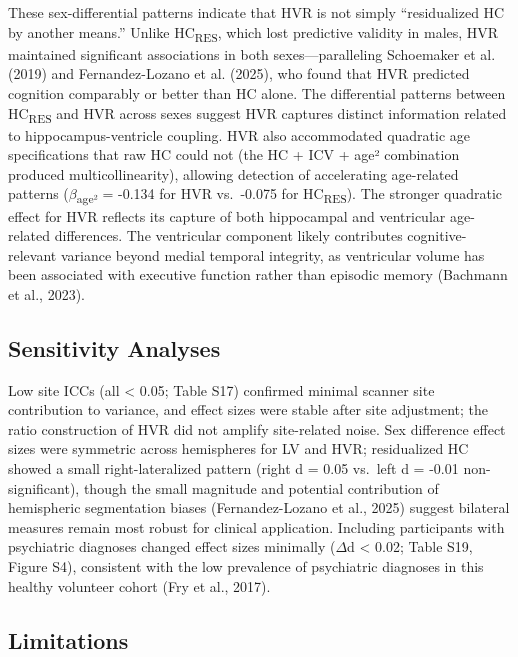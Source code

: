 \documentclass[
]{article}
\begin{document}
These sex-differential patterns indicate that HVR is not simply
``residualized HC by another means.'' Unlike HC\textsubscript{RES},
which lost predictive validity in males, HVR maintained significant
associations in both sexes---paralleling Schoemaker et al. (2019) and
Fernandez-Lozano et al. (2025), who found that HVR predicted cognition
comparably or better than HC alone. The differential patterns between
HC\textsubscript{RES} and HVR across sexes suggest HVR captures distinct
information related to hippocampus-ventricle coupling. HVR also
accommodated quadratic age specifications that raw HC could not (the HC
+ ICV + age² combination produced multicollinearity), allowing detection
of accelerating age-related patterns (\(\beta\)\textsubscript{age²} =
-0.134 for HVR vs.~-0.075 for HC\textsubscript{RES}). The stronger
quadratic effect for HVR reflects its capture of both hippocampal and
ventricular age-related differences. The ventricular component likely
contributes cognitive-relevant variance beyond medial temporal
integrity, as ventricular volume has been associated with executive
function rather than episodic memory (Bachmann et al., 2023).

\subsection{Sensitivity Analyses}\label{sensitivity-analyses-2}

Low site ICCs (all \textless{} 0.05; Table S17) confirmed minimal
scanner site contribution to variance, and effect sizes were stable
after site adjustment; the ratio construction of HVR did not amplify
site-related noise. Sex difference effect sizes were symmetric across
hemispheres for LV and HVR; residualized HC showed a small
right-lateralized pattern (right d = 0.05 vs.~left d = -0.01
non-significant), though the small magnitude and potential contribution
of hemispheric segmentation biases (Fernandez-Lozano et al., 2025)
suggest bilateral measures remain most robust for clinical application.
Including participants with psychiatric diagnoses changed effect sizes
minimally (\(\Delta\)d \textless{} 0.02; Table S19, Figure S4),
consistent with the low prevalence of psychiatric diagnoses in this
healthy volunteer cohort (Fry et al., 2017).

\subsection{Limitations}\label{limitations}
\end{document}
